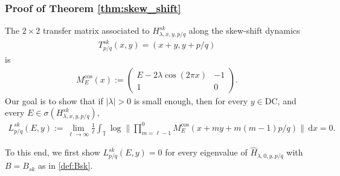 \documentclass[11pt]{amsart}
\newcommand{\T}{\mathbb T}
\begin{document}
\subsubsection*{Proof of Theorem \ref{thm:skew_shift}}
The $2\times 2$ transfer matrix associated to $H^{sk}_{\lambda,x,y,p/q}$ along the skew-shift dynamics \begin{align}\label{def:skew_shift}
T^{sk}_{p/q}(x,y)=(x+y, y+p/q)
\end{align}
is
\begin{align}
    M^{\cos}_{E}(x):=\left(\begin{matrix}
        E-2\lambda\cos(2\pi x) &-1\\
        1 &0
    \end{matrix}\right).
\end{align}
Our goal is to show that if $|\lambda|>0$ is small enough, then for every $y\in \mathrm{DC}$, and every $E\in \sigma(H^{sk}_{\lambda,x,y,p/q})$, 
\begin{align}\label{eq:zero_LE_goal}
    L^{sk}_{p/q}(E,y):=\lim_{\ell\to\infty} \frac{1}{\ell}\int_{\T} \log \|\prod_{m=\ell-1}^0 M_E^{\cos}(x+my+m(m-1)p/q)\|\, \mathrm{d}x=0.
\end{align}

To this end, we first show $L^{sk}_{p/q}(E,y)=0$ for every eigenvalue of $\widehat{H}_{\lambda,0,y,p/q}$ with $B=B_{sk}$ as in \eqref{def:Bsk}.
\end{document}
